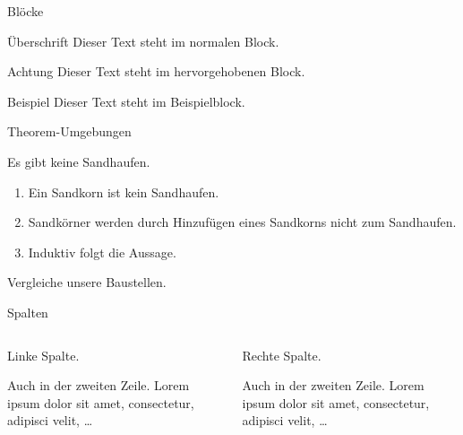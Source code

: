 \documentclass{beamer}
\begin{document}
  \begin{frame}{Blöcke}
    \begin{block}{Überschrift}
      Dieser Text steht im normalen Block.
    \end{block}

    \begin{alertblock}{Achtung}
      Dieser Text steht im hervorgehobenen Block.
    \end{alertblock}

    \begin{exampleblock}{Beispiel}
      Dieser Text steht im Beispielblock.
    \end{exampleblock}
  \end{frame}

  \begin{frame}{Theorem-Umgebungen}
    \begin{Satz}[Sandhaufensatz]
      Es gibt keine Sandhaufen.
    \end{Satz}

    \begin{Beweis}
      \begin{enumerate}
        \item Ein Sandkorn ist kein Sandhaufen.
        \item Sandkörner werden durch Hinzufügen
          eines Sandkorns nicht zum Sandhaufen.
        \item Induktiv folgt die Aussage. \qedhere
      \end{enumerate}
    \end{Beweis}

    \begin{Beispiel}
      Vergleiche unsere Baustellen.
    \end{Beispiel}
  \end{frame}

  \newcommand{\lorem}{\textcolor{black!40}{Auch in der zweiten Zeile. Lorem ipsum dolor sit amet, consectetur, adipisci velit, \ldots}}

  \begin{frame}{Spalten}
    \begin{columns}
      \begin{column}{5cm}
        Linke Spalte.

        \lorem
      \end{column}
      \begin{column}{5cm}
        Rechte Spalte.

        \lorem
      \end{column}
    \end{columns}
  \end{frame}
\end{document}
